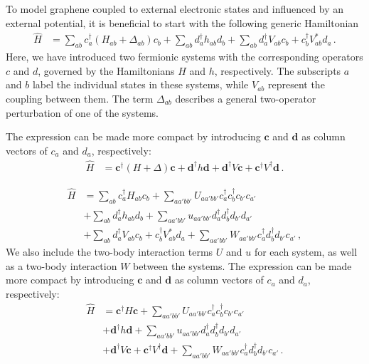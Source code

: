 \documentclass[aps, prb, superscriptaddress, preprint, floatfix]{revtex4-1}
\begin{document}
To model graphene coupled to external electronic states and influenced by an external potential, it is beneficial to start with the following generic Hamiltonian
%
\begin{align}
	\hat{H} &= \sum_{ab} c^\dagger_a \left(H_{ab} +\Delta_{ab}\right)c_b + \sum_{ab} d^\dagger_a h_{ab} d_b+ \sum_{ab} d^\dagger_a V_{ab} c_b + c^\dagger_b V_{ab}^* d_a
	\,.
\end{align}
%
Here, we have introduced two fermionic systems with the corresponding operators $c$ and $d$, governed by the Hamiltonians $H$ and $h$, respectively. The subscripts $a$ and $b$ label the individual states in these systems, while $V_{ab}$ represent the coupling between them. The term $\Delta_{ab}$ describes a general two-operator perturbation of one of the systems.

The expression can be made more compact by introducing $\mathbf{c}$ and $\mathbf{d}$ as column vectors of $c_a$ and $d_a$, respectively:
%
\begin{align}
	\hat{H} &= 	\mathbf{c}^\dagger \left(H+\Delta\right)\mathbf{c}
	+ 	\mathbf{d}^\dagger h\mathbf{d}
	+ \mathbf{d}^\dagger V \mathbf{c} +  \mathbf{c}^\dagger V^\dagger \mathbf{d}
	\,.
\end{align}
%

%
\begin{align}
	\hat{H} &= \sum_{ab} c^\dagger_a H_{ab} c_b 
	+ 
	\sum_{aa'bb'}U_{aa'bb'} c_a^\dagger c_b^\dagger c_{b'} c_{a'}
	\nonumber
	\\
	&+ \sum_{ab} d^\dagger_a h_{ab} d_b
	 +
	  \sum_{aa'bb'}u_{aa'bb'} d_a^\dagger d_b^\dagger d_{b'} d_{a'}
	\nonumber
	\\
	&+ \sum_{ab} d^\dagger_a V_{ab} c_b + c^\dagger_b V_{ab}^* d_a
	+ 
	\sum_{aa'bb'}W_{aa'bb'} c_a^\dagger d_b^\dagger d_{b'} c_{a'}\,,
\end{align}
%
We also include the two-body interaction terms $U$ and $u$ for each system, as well as a two-body interaction $W$ between the systems. The expression can be made more compact by introducing $\mathbf{c}$ and $\mathbf{d}$ as column vectors of $c_a$ and $d_a$, respectively:
%
\begin{align}
	\hat{H} &= 	\mathbf{c}^\dagger H\mathbf{c}
	+ 
	\sum_{aa'bb'}U_{aa'bb'} c_a^\dagger c_b^\dagger c_{b'} c_{a'}
	\nonumber
	\\
	&+ 	\mathbf{d}^\dagger h\mathbf{d}
	 +
	  \sum_{aa'bb'}u_{aa'bb'} d_a^\dagger d_b^\dagger d_{b'} d_{a'}
	\nonumber
	\\
	&+ \mathbf{d}^\dagger V \mathbf{c} +  \mathbf{c}^\dagger V^\dagger \mathbf{d}
	+ 
	\sum_{aa'bb'}W_{aa'bb'} c_a^\dagger d_b^\dagger d_{b'} c_{a'}\,.
\end{align}
%
\end{document}
